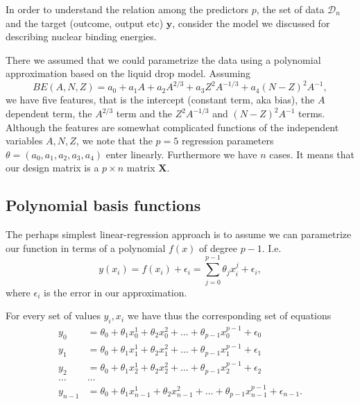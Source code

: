 \documentclass[%
oneside,                 %
final,                   %
10pt]{article}
\newenvironment{block_mdfboxadmon}[1][]{
\begin{block_mdfboxmdframed}[frametitle=#1]
}
{
\end{block_mdfboxmdframed}
}
\begin{document}
\begin{block_mdfboxadmon}[]
In order to understand the relation among the predictors $p$, the set of data $\mathcal{D}_n$ and the target (outcome, output etc) $\bm{y}$,
consider the model we discussed for describing nuclear binding energies. 

There we assumed that we could parametrize the data using a polynomial approximation based on the liquid drop model.
Assuming 
\[
BE(A,N,Z) = a_0+a_1A+a_2A^{2/3}+a_3 Z^2 A^{-1/3}+a_4 (N-Z)^2 A^{-1},
\]
we have five features, that is the intercept (constant term, aka bias), the $A$ dependent term, the $A^{2/3}$ term and the $Z^2 A^{-1/3}$ and $(N-Z)^2 A^{-1}$ terms. Although the features are somewhat complicated functions of the independent variables $A,N,Z$, we note that the $p=5$ regression parameters $\theta = (a_0, a_1, a_2, a_3, a_4)$ enter linearly. Furthermore we have $n$ cases. It means that our design matrix is a 
$p\times n$ matrix $\bm{X}$.
\end{block_mdfboxadmon} %




\subsection{Polynomial basis functions}

\begin{block_mdfboxadmon}[]
The perhaps simplest linear-regression approach is to assume we can parametrize our function in terms of a polynomial $f(x)$ of degree $p-1$. I.e.
\[
y(x_i)=f({x}_i)+\epsilon_i=\sum_{j=0}^{p-1} \theta_j x_i^j+\epsilon_i,
\]
where $\epsilon_i$ is the error in our approximation.
\end{block_mdfboxadmon} %





\begin{block_mdfboxadmon}[]
For every set of values $y_i,x_i$ we have thus the corresponding set of equations
\begin{align*}
y_0&=\theta_0+\theta_1x_0^1+\theta_2x_0^2+\dots+\theta_{p-1}x_0^{p-1}+\epsilon_0\\
y_1&=\theta_0+\theta_1x_1^1+\theta_2x_1^2+\dots+\theta_{p-1}x_1^{p-1}+\epsilon_1\\
y_2&=\theta_0+\theta_1x_2^1+\theta_2x_2^2+\dots+\theta_{p-1}x_2^{p-1}+\epsilon_2\\
\dots & \dots \\
y_{n-1}&=\theta_0+\theta_1x_{n-1}^1+\theta_2x_{n-1}^2+\dots+\theta_{p-1}x_{n-1}^{p-1}+\epsilon_{n-1}.\\
\end{align*}
\end{block_mdfboxadmon} %
\end{document}
